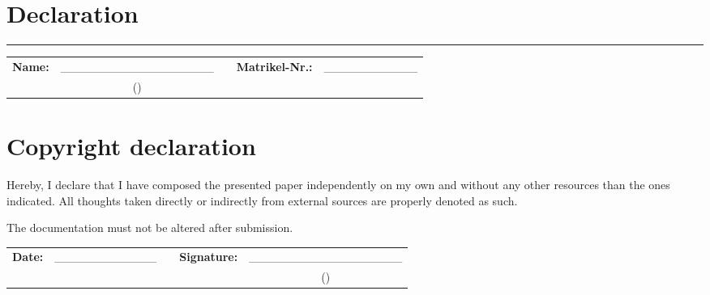 \section*{\Huge{Declaration}}
\baselineskip
\rule{\textwidth}{.5pt}
\baselineskip
\begin{tabular}{lcp{.5cm}ll}
\textbf{Name:} & \_\_\_\_\_\_\_\_\_\_\_\_\_\_\_\_\_\_&  & \textbf{Matrikel-Nr.:}&	\_\_\_\_\_\_\_\_\_\_\_\\
& 	(\reportauthor) &&&
\end{tabular}

\section*{Copyright declaration}

Hereby, I declare that I have composed the presented paper independently on my own and without any other resources than the ones indicated. All thoughts taken directly or indirectly from external sources are properly denoted as such.

The documentation must not be altered after submission.
\vspace*{1cm}

\begin{tabular}{llp{.5cm}lc}
	\textbf{Date:} &\_\_\_\_\_\_\_\_\_\_\_\_&  & \textbf{Signature:}&	\_\_\_\_\_\_\_\_\_\_\_\_\_\_\_\_\_\_\\
	&&&&(\reportauthor) 
\end{tabular}
\restoregeometry
